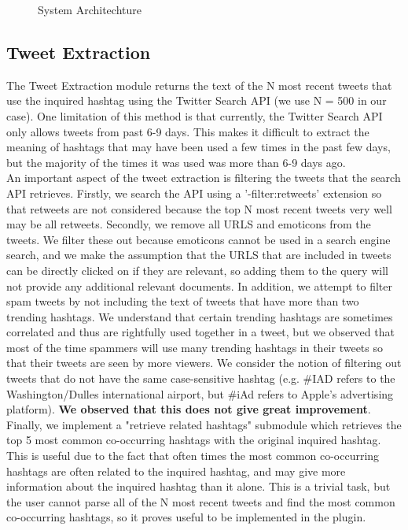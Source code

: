 \documentclass{sig-alternate}
\begin{document}
\begin{figure}[h!]
   \caption{System Architechture} \label{fig:SystemArchitechture}
\end{figure}


\subsection{Tweet Extraction}
The Tweet Extraction module returns the text of the N most recent tweets that use the inquired hashtag using the Twitter Search API (we use N = 500 in our case). One limitation of this method is that currently, the Twitter Search API  only allows tweets from past 6-9 days. This makes it difficult to extract the meaning of hashtags that may have been used a few times in the past few days, but the majority of the times it was used was more than 6-9 days ago. \\
An important aspect of the tweet extraction is filtering the tweets that the search API retrieves. Firstly, we search the API using a '-filter:retweets' extension so that retweets are not considered because the top N most recent tweets very well may be all retweets. Secondly, we remove all URLS and emoticons from the tweets. We filter these out because emoticons cannot be used in a search engine search, and we make the assumption that the URLS that are included in tweets can be directly clicked on if they are relevant, so adding them to the query will not provide any additional relevant documents. In addition, we attempt to filter spam tweets by not including the text of tweets that have more than two trending hashtags. We understand that certain trending hashtags are sometimes correlated and thus are rightfully used together in a tweet, but we observed that most of the time spammers will use many trending hashtags in their tweets so that their tweets are seen by more viewers.
We consider the notion of filtering out tweets that do not have the same case-sensitive hashtag (e.g. \#IAD refers to the Washington/Dulles international airport, but \#iAd refers to Apple's advertising platform). \textbf{We observed that this does not give great improvement}.\\
Finally, we implement a "retrieve related hashtags" submodule which retrieves the top 5 most common co-occurring hashtags with the original inquired hashtag. This is useful due to the fact that often times the most common co-occurring hashtags are often related to the inquired hashtag, and may give more information about the inquired hashtag than it alone. This is a trivial task, but the user cannot parse all of the N most recent tweets and find the most common co-occurring hashtags, so it proves useful to be implemented in the plugin. 
\end{document}
